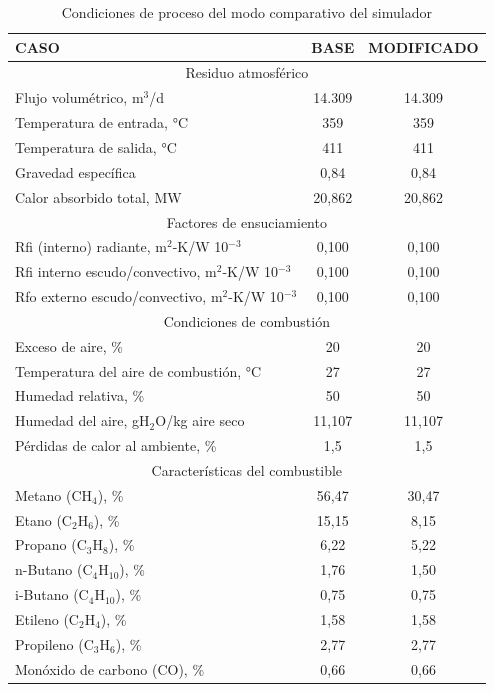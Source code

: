 \begin{table}[H]
\caption{Condiciones de proceso del modo comparativo del simulador}
\label{tbl:comparison-cp} \centering \begin{tabular}{l|c|c}
\quad\quad\quad CASO    & BASE & MODIFICADO \\
\hline
\multicolumn{3}{c}{Residuo atmosférico} \\
Flujo volumétrico,  m$^3$/d   &14.309 &14.309 \\
Temperatura de entrada,  °C   &359    &359    \\
Temperatura de salida,  °C    &411    &411    \\
Gravedad específica           &0,84   &0,84   \\
Calor absorbido total,  MW    &20,862 &20,862 \\
\hline
\multicolumn{3}{c}{Factores de ensuciamiento} \\
Rfi (interno) radiante,  m$^2$-K/W 10$^{-3}$        &0,100  &0,100 \\
Rfi interno escudo/convectivo,  m$^2$-K/W 10$^{-3}$ &0,100  &0,100 \\
Rfo externo escudo/convectivo,  m$^2$-K/W 10$^{-3}$ &0,100  &0,100 \\
\hline
\multicolumn{3}{c}{Condiciones de combustión} \\
Exceso de aire, \%                      &20     &20   \\
Temperatura del aire de combustión, °C  &27     &27   \\
Humedad relativa, \%                    &50     &50   \\
Humedad del aire,  gH$_2$O/kg aire seco &11,107 &11,107\\
Pérdidas de calor al ambiente, \%       &1,5    &1,5  \\
\hline
\multicolumn{3}{c}{Características del combustible} \\
Metano (CH$_4$), \%          &56,47  &30,47  \\
Etano (C$_2$H$_6$), \%       &15,15  &8,15   \\
Propano (C$_3$H$_8$), \%     &6,22   &5,22   \\
n-Butano (C$_4$H$_{10}$), \% &1,76   &1,50   \\
i-Butano (C$_4$H$_{10}$), \% &0,75   &0,75   \\
Etileno (C$_2$H$_4$), \%     &1,58   &1,58   \\
Propileno (C$_3$H$_6$), \%   &2,77   &2,77   \\
Monóxido de carbono (CO), \% &0,66   &0,66   \\

\end{tabular}
\end{table}

